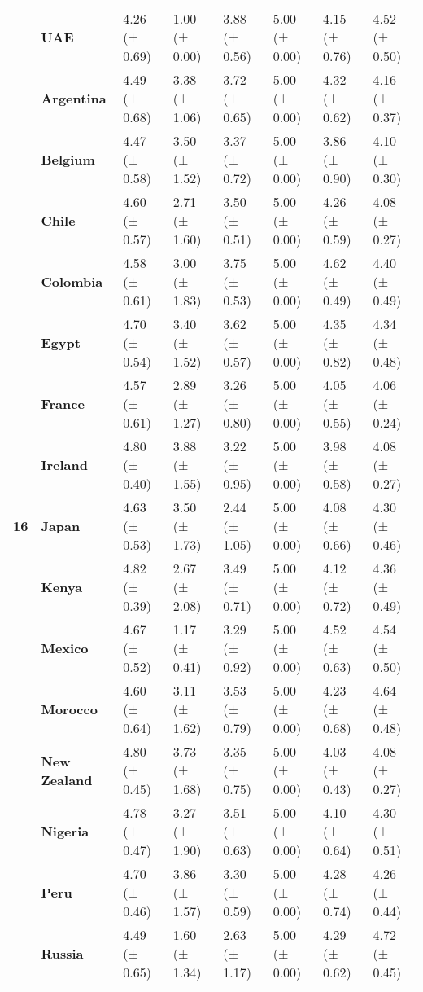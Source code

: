 \begin{longtable}{llllllll}
\textbf{} & \textbf{UAE} & 4.26 (± 0.69) & 1.00 (± 0.00) & 3.88 (± 0.56) & 5.00 (± 0.00) & 4.15 (± 0.76) & 4.52 (± 0.50) \\
\cline{1-8}
\multirow[t]{19}{*}{\textbf{16}} & \textbf{Argentina} & 4.49 (± 0.68) & 3.38 (± 1.06) & 3.72 (± 0.65) & 5.00 (± 0.00) & 4.32 (± 0.62) & 4.16 (± 0.37) \\
\textbf{} & \textbf{Belgium} & 4.47 (± 0.58) & 3.50 (± 1.52) & 3.37 (± 0.72) & 5.00 (± 0.00) & 3.86 (± 0.90) & 4.10 (± 0.30) \\
\textbf{} & \textbf{Chile} & 4.60 (± 0.57) & 2.71 (± 1.60) & 3.50 (± 0.51) & 5.00 (± 0.00) & 4.26 (± 0.59) & 4.08 (± 0.27) \\
\textbf{} & \textbf{Colombia} & 4.58 (± 0.61) & 3.00 (± 1.83) & 3.75 (± 0.53) & 5.00 (± 0.00) & 4.62 (± 0.49) & 4.40 (± 0.49) \\
\textbf{} & \textbf{Egypt} & 4.70 (± 0.54) & 3.40 (± 1.52) & 3.62 (± 0.57) & 5.00 (± 0.00) & 4.35 (± 0.82) & 4.34 (± 0.48) \\
\textbf{} & \textbf{France} & 4.57 (± 0.61) & 2.89 (± 1.27) & 3.26 (± 0.80) & 5.00 (± 0.00) & 4.05 (± 0.55) & 4.06 (± 0.24) \\
\textbf{} & \textbf{Ireland} & 4.80 (± 0.40) & 3.88 (± 1.55) & 3.22 (± 0.95) & 5.00 (± 0.00) & 3.98 (± 0.58) & 4.08 (± 0.27) \\
\textbf{} & \textbf{Japan} & 4.63 (± 0.53) & 3.50 (± 1.73) & 2.44 (± 1.05) & 5.00 (± 0.00) & 4.08 (± 0.66) & 4.30 (± 0.46) \\
\textbf{} & \textbf{Kenya} & 4.82 (± 0.39) & 2.67 (± 2.08) & 3.49 (± 0.71) & 5.00 (± 0.00) & 4.12 (± 0.72) & 4.36 (± 0.49) \\
\textbf{} & \textbf{Mexico} & 4.67 (± 0.52) & 1.17 (± 0.41) & 3.29 (± 0.92) & 5.00 (± 0.00) & 4.52 (± 0.63) & 4.54 (± 0.50) \\
\textbf{} & \textbf{Morocco} & 4.60 (± 0.64) & 3.11 (± 1.62) & 3.53 (± 0.79) & 5.00 (± 0.00) & 4.23 (± 0.68) & 4.64 (± 0.48) \\
\textbf{} & \textbf{New Zealand} & 4.80 (± 0.45) & 3.73 (± 1.68) & 3.35 (± 0.75) & 5.00 (± 0.00) & 4.03 (± 0.43) & 4.08 (± 0.27) \\
\textbf{} & \textbf{Nigeria} & 4.78 (± 0.47) & 3.27 (± 1.90) & 3.51 (± 0.63) & 5.00 (± 0.00) & 4.10 (± 0.64) & 4.30 (± 0.51) \\
\textbf{} & \textbf{Peru} & 4.70 (± 0.46) & 3.86 (± 1.57) & 3.30 (± 0.59) & 5.00 (± 0.00) & 4.28 (± 0.74) & 4.26 (± 0.44) \\
\textbf{} & \textbf{Russia} & 4.49 (± 0.65) & 1.60 (± 1.34) & 2.63 (± 1.17) & 5.00 (± 0.00) & 4.29 (± 0.62) & 4.72 (± 0.45) \\

\end{longtable}
